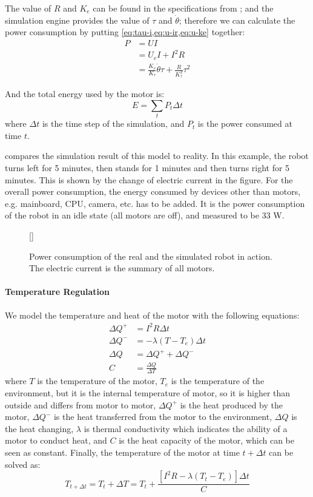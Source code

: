 \documentclass{llncs}
\newcommand{\inputtikz}[1]
{
  \StrSubstitute{#1}{/}{.}[\fn]
  \scancs{\filename}{\fn}
  \tikzsetfigurename{\filename}
  
}
\begin{document}
The value of $R$ and $K_e$ can be found in the specifications from \cite{naoqi};
and the simulation engine provides
the value of $\tau$ and $\dot{\theta}$; therefore we can calculate the
power consumption by putting \cref{eq:tau-i,eq:u-ir,eq:u-ke} together:
\begin{align}
  P &= UI \\
  &= U_eI + I^2R \\
  &= \frac{K_e}{K_\tau}\dot{\theta}\tau + \frac{R}{K_\tau^2}\tau^2
\end{align}

And the total energy used by the motor is:
\begin{equation}
  \label{eq:motor-power}
  E = \sum_t{P_t\Delta{}t}
\end{equation}
where $\Delta{}t$ is the time step of the simulation, and $P_t$ is the power consumed at time $t$. 

 compares the simulation result of this model to
reality. In this example, the robot turns left for 5 minutes, then
stands for 1 minutes and then turns right for 5 minutes. This is shown by the change of electric current in the figure. For the overall
power consumption, the energy consumed by devices other than motors,
e.g. mainboard, CPU, camera, etc. has to be added. It is the power
consumption of the robot in an idle state (all motors are off), and measured to be 33 W.
\begin{figure}
  \centering
  \inputtikz{battery}
  \caption{Power consumption of the real and the simulated robot in action.
    The electric current is the summary of all motors.}
  \label{fig:battery}
\end{figure}

\paragraph{Temperature Regulation}
We model the temperature and heat of the motor with the following equations:
\begin{align}
  \Delta{}Q^+ &= I^2R\Delta{}t \\
  \Delta{}Q^- &= -\lambda(T-T_e)\Delta{}t \\
  \Delta{}Q &= \Delta{}Q^+ + \Delta{}Q^-\\
  C &= \frac{\Delta{}Q}{\Delta{}T}
\end{align}
where $T$ is the temperature of the motor, $T_e$
is the temperature of the environment, but it is the internal temperature
of motor, so it is higher than outside and differs from motor to
motor, $\Delta{}Q^+$ is the heat produced by the motor, $\Delta{}Q^-$ is
the heat transferred from the motor to the environment, $\Delta{}Q$ is the
heat changing, $\lambda$ is thermal conductivity which indicates the
ability of a motor to conduct heat, and $C$ is the heat capacity of
the motor, which can be seen as constant. Finally, the temperature of
the motor at time $t+\Delta{}t$ can be solved as:
\begin{equation}
  \label{eq:motor-temp}
  T_{t+\Delta{}t} = T_t + \Delta{}T = T_t + \frac{[I^2R-\lambda(T_t-T_e)]\Delta{}t}{C}
\end{equation}
\end{document}
